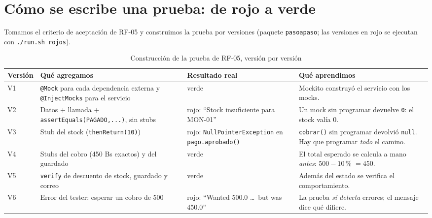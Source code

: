 \documentclass[11pt,a4paper,oneside]{report}
\newcommand{\code}[1]{\texttt{#1}}
\begin{document}
\newcommand{\ficha}[7]{%
\begin{tcolorbox}[colback=white,colframe=primario,fonttitle=\bfseries\small,title={#1},arc=2pt,boxrule=0.6pt,left=3pt,right=3pt,top=1pt,bottom=1pt]
\scriptsize
\begin{tabularx}{\linewidth}{@{}>{\bfseries}p{2.4cm}X@{}}
Origen / técnica & #2\\
Datos de entrada & #3\\
Stubs (mocks) & #4\\
Pasos & #5\\
Resultado esperado & #6\\
Verificaciones & #7\\
Resultado obtenido & Coincide con lo esperado: \textcolor{verde}{\textbf{APROBADO}}\\
\end{tabularx}
\end{tcolorbox}}

\section{Cómo se escribe una prueba: de rojo a verde}
Tomamos el criterio de aceptación de RF-05 y construimos la prueba por versiones (paquete \code{pasoapaso}; las versiones en rojo se ejecutan con \code{./run.sh rojos}).

\begin{table}[H]
\centering
\caption{Construcción de la prueba de RF-05, versión por versión}
\small
\begin{tabularx}{\linewidth}{lXXX}
\toprule
\textbf{Versión} & \textbf{Qué agregamos} & \textbf{Resultado real} & \textbf{Qué aprendimos}\\
\midrule
V1 & \code{@Mock} para cada dependencia externa y \code{@InjectMocks} para el servicio & \textcolor{verde}{verde} & Mockito construyó el servicio con los mocks.\\
V2 & Datos + llamada + \code{assertEquals(PAGADO,...)}, sin stubs & \textcolor{acento}{rojo}: ``Stock insuficiente para MON-01'' & Un mock sin programar devuelve \code{0}: el stock valía 0.\\
V3 & Stub del stock (\code{thenReturn(10)}) & \textcolor{acento}{rojo}: \code{NullPointerException} en \code{pago.aprobado()} & \code{cobrar()} sin programar devolvió \code{null}. Hay que programar \emph{todo} el camino.\\
V4 & Stubs del cobro (450 Bs exactos) y del guardado & \textcolor{verde}{verde} & El total esperado se calcula a mano \emph{antes}: $500 - 10$\,\% $= 450$.\\
V5 & \code{verify} de descuento de stock, guardado y correo & \textcolor{verde}{verde} & Además del estado se verifica el comportamiento.\\
V6 & Error del tester: esperar un cobro de 500 & \textcolor{acento}{rojo}: ``Wanted 500.0 \ldots\ but was 450.0'' & La prueba \emph{sí detecta} errores; el mensaje dice qué difiere.\\
\bottomrule
\end{tabularx}
\end{table}
\end{document}
